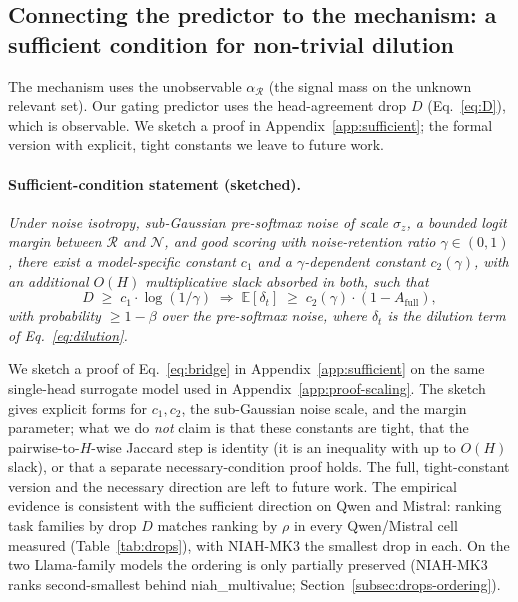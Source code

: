 \documentclass{article} %
\begin{document}
\subsection{Connecting the predictor to the mechanism: a sufficient
condition for non-trivial dilution}
\label{subsec:conjecture}

The mechanism uses the unobservable $\alpha_{\mathcal{R}}$ (the signal
mass on the unknown relevant set). Our gating predictor uses the
head-agreement drop $D$ (Eq.~\eqref{eq:D}), which is observable. We
sketch a proof in Appendix~\ref{app:sufficient}; the formal version with
explicit, tight constants we leave to future work.

\paragraph{Sufficient-condition statement (sketched).}
\emph{Under noise isotropy, sub-Gaussian pre-softmax noise of scale
$\sigma_z$, a bounded logit margin between $\mathcal{R}$ and
$\mathcal{N}$, and good scoring with noise-retention ratio $\gamma \in
(0, 1)$, there exist a model-specific constant $c_1$ and a
$\gamma$-dependent constant $c_2(\gamma)$, with an additional $O(H)$
multiplicative slack absorbed in both, such that}
\begin{equation}
\label{eq:bridge}
D \;\ge\; c_1 \cdot \log(1/\gamma)
\;\Longrightarrow\;
\mathbb{E}[\delta_t] \;\ge\; c_2(\gamma) \cdot (1 - A_{\mathrm{full}}),
\end{equation}
\emph{with probability $\geq 1 - \beta$ over the pre-softmax noise, where
$\delta_t$ is the dilution term of Eq.~\eqref{eq:dilution}.}

We sketch a proof of Eq.~\eqref{eq:bridge} in
Appendix~\ref{app:sufficient} on the same single-head surrogate model used
in Appendix~\ref{app:proof-scaling}. The sketch gives explicit forms for
$c_1, c_2$, the sub-Gaussian noise scale, and the margin parameter; what
we do \emph{not} claim is that these constants are tight, that the
pairwise-to-$H$-wise Jaccard step is identity (it is an inequality with
up to $O(H)$ slack), or that a separate necessary-condition proof holds.
The full, tight-constant version and the necessary direction are left to
future work. The empirical evidence is consistent with the sufficient
direction on Qwen and Mistral: ranking task families by drop $D$ matches
ranking by $\rho$ in every Qwen/Mistral cell measured
(Table~\ref{tab:drops}), with NIAH-MK3 the smallest drop in each. On the
two Llama-family models the ordering is only partially preserved
(NIAH-MK3 ranks second-smallest behind niah\_multivalue;
Section~\ref{subsec:drops-ordering}).
\end{document}
